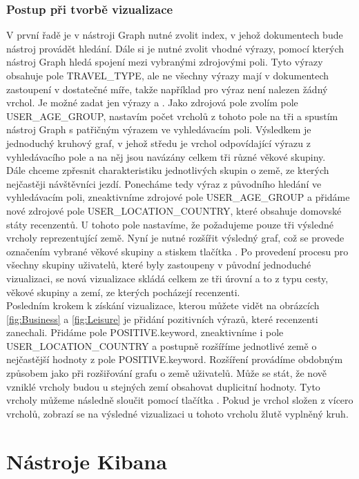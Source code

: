 \documentclass[czech,BP]{thesiskiv}
\begin{document}
\subsubsection{Postup při tvorbě vizualizace}
V první řadě je v nástroji Graph nutné zvolit index, v jehož dokumentech bude nástroj provádět hledání. Dále si je nutné zvolit vhodné výrazy, pomocí kterých nástroj Graph hledá spojení mezi vybranými zdrojovými poli. Tyto výrazy obsahuje pole TRAVEL\_TYPE, ale ne všechny výrazy mají v dokumentech zastoupení v dostatečné míře, takže například pro výraz  není nalezen žádný vrchol. Je možné zadat jen výrazy  a . Jako zdrojová pole zvolím pole USER\_AGE\_GROUP, nastavím počet vrcholů z tohoto pole na tři a spustím nástroj Graph s patřičným výrazem ve vyhledávacím poli. Výsledkem je jednoduchý kruhový graf, v jehož středu je vrchol odpovídající výrazu z vyhledávacího pole a na něj jsou navázány celkem tři různé věkové skupiny.
\\
Dále chceme zpřesnit charakteristiku jednotlivých skupin o země, ze kterých nejčastěji návštěvníci jezdí. Ponecháme tedy výraz z původního hledání ve vyhledávacím poli, zneaktivníme zdrojové pole USER\_AGE\_GROUP a přidáme nové zdrojové pole USER\_LOCATION\_COUNTRY, které obsahuje domovské státy recenzentů. U tohoto pole nastavíme, že požadujeme pouze tři výsledné vrcholy reprezentující země. Nyní je nutné rozšířit výsledný graf, což se provede označením vybrané věkové skupiny a stiskem tlačítka . Po provedení procesu  pro všechny skupiny uživatelů, které byly zastoupeny v původní jednoduché vizualizaci, se nová vizualizace skládá celkem ze tři úrovní a to z typu cesty, věkové skupiny a zemí, ze kterých pocházejí recenzenti.
\\
Posledním krokem k získání vizualizace, kterou můžete vidět na obrázcích \ref{fig:Business} a \ref{fig:Leisure} je přidání pozitivních výrazů, které recenzenti zanechali. Přidáme pole POSITIVE.keyword, zneaktivníme i pole USER\_LOCATION\_COUNTRY a postupně rozšíříme jednotlivé země o nejčastější hodnoty z pole POSITIVE.keyword. Rozšíření provádíme obdobným způsobem jako při rozšiřování grafu o země uživatelů. Může se stát, že nově vzniklé vrcholy budou u stejných zemí obsahovat duplicitní hodnoty. Tyto vrcholy můžeme následně sloučit pomocí tlačítka . Pokud je vrchol složen z vícero vrcholů, zobrazí se na výsledné vizualizaci u tohoto vrcholu žlutě vyplněný kruh.

\section{Nástroje Kibana}
\end{document}
